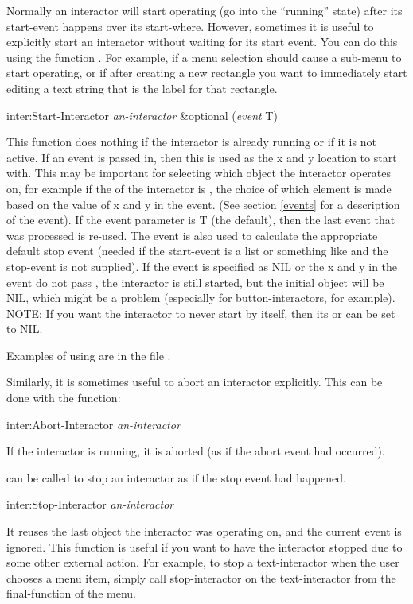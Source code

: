 Normally an interactor will start operating (go into the ``running'' state)
after its start-event happens over its start-where.  However, sometimes it
is useful to explicitly start an interactor without waiting for its start
event.  You can do this using the function .
For example, if a menu selection should cause a sub-menu to start
operating, or if after creating a new rectangle you want to immediately
start editing a text string that is the label for that rectangle.

\begin{programexample}
inter:Start-Interactor {\it an-interactor} \&optional ({\it event} T)\value{function}
\end{programexample}

This function does nothing if the interactor is already running or if it is
not active.
If an event is passed in, then this is used as the x and y location to
start with.  This may be important for selecting which object the
interactor operates on, for example if the  of the
interactor is , the choice of which element is made
based on the value of x and y in the event.
(See section \ref{events} for a description of the event).  If
the event parameter is T (the default), then the last event that
was processed is re-used.  The event is also used to calculate
the appropriate default stop event (needed if the start-event is
a list or something like  and the stop-event is not supplied).
If the event is specified as NIL or the x and y in the event do not pass
, the interactor is still started, but the initial object
will be NIL, which might be a problem (especially for button-interactors,
for example).  NOTE: If you want the interactor to never start by itself,
then its  or  can be set to NIL.

Examples of using  are in the file .

Similarly, it is sometimes useful to abort an interactor explicitly.  This
can be done with the function:
\begin{programexample}
inter:Abort-Interactor {\it an-interactor}\value{function}
\end{programexample}
If the interactor is running, it is aborted (as if the abort event had occurred).

 can be called to stop an interactor as if the stop
event had happened.
\begin{programexample}
inter:Stop-Interactor {\it an-interactor}\value{function}
\end{programexample}
It reuses the last object the interactor was operating on, and the current event is
ignored.  This function is useful if you want to have the interactor
stopped due to some other external action.
For example, to stop a text-interactor when the user chooses a menu item,
simply call stop-interactor on the text-interactor from the final-function
of the menu.

